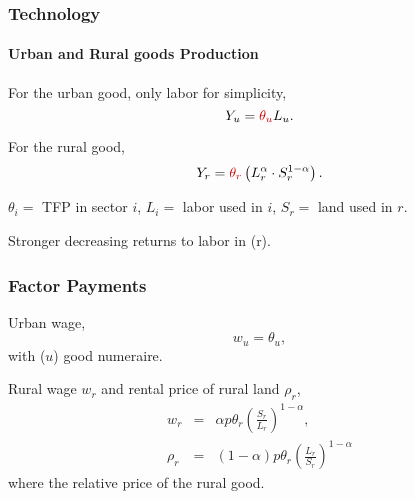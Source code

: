 \documentclass[aspectratio=169]{beamer}
\begin{document}
\begin{v75mins}
\begin{frame}
\frametitle{Technology}
\framesubtitle{Urban and Rural goods Production}
\begin{midi}
\item For the urban good, only labor for simplicity,
\begin{equation*}
Y_u=\re{\theta_u}L_u.
\end{equation*}
\item For the rural good,
\begin{equation*}
Y_r=\re{\theta_r} \left( L_r^\alpha \cdot S_r^{1-\alpha} \right). 
\end{equation*}
\item $\theta_i=$ TFP in sector $i$, $L_i=$ labor used in $i$, $S_r=$ land used in $r$.
\item {}
\item Stronger decreasing returns to labor in (r).
\end{midi}

\end{frame}


\begin{frame}
\frametitle{Factor Payments}

Urban wage,
\begin{equation*}w_u=\theta_u, \end{equation*}
with ($u$) good numeraire.

\bigskip
\pause
Rural wage $w_r$ and rental price of rural land $\rho_r$,
\begin{eqnarray*}
w_r&=&\alpha p\theta_r \left( \frac{S_r}{L_r} \right)^{1-\alpha}, \\
\rho_r&=&(1-\alpha) p\theta_r \left( \frac{L_r}{S_r} \right)^{1-\alpha}
\end{eqnarray*}
where  the relative price of the rural good.
\end{frame}


\end{v75mins}
\end{document}
